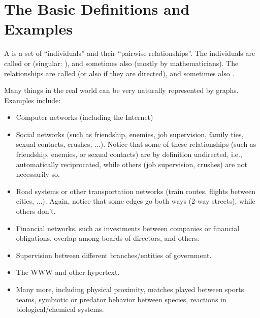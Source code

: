 \section{The Basic Definitions and Examples}
A  is a set of ``individuals'' and their ``pairwise
relationships''. The individuals are called  or
 (singular: ), and sometimes also
 (mostly by mathematicians).
The relationships are called  (or also  if they
are directed), and sometimes also .

Many things in the real world can be very naturally represented by
graphs. Examples include: 
\begin{itemize}
\item Computer networks (including the Internet)
\item Social networks (such as friendship, enemies, job supervision,
  family ties, sexual contacts, crushes, $\ldots$).
Notice that some of these relationships (such as friendship, enemies,
or sexual contacts) are by definition undirected, i.e., automatically
reciprocated, while others (job supervision, crushes) are not
necessarily so. 
\item Road systems or other transportation networks (train routes,
  flights between cities, $\ldots$). Again, notice that some edges go
  both ways (2-way streets), while others don't.
\item Financial networks, such as investments between companies or
  financial obligations, overlap among boards of directors, and
  others.
\item Supervision between different branches/entities of government.
\item The WWW and other hypertext.
\item Many more, including physical proximity, matches played between
  sports teams, symbiotic or predator behavior between species,
  reactions in biological/chemical systems.
\end{itemize}


